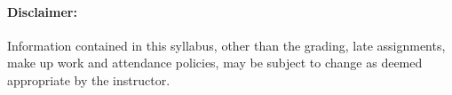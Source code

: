 \documentclass[12pt, letterpaper]{article}
\begin{document}
\paragraph{Disclaimer:}
Information contained in this syllabus, other than the grading, late assignments, make up work and attendance policies, may be subject to change as deemed appropriate by the instructor.
\end{document}
